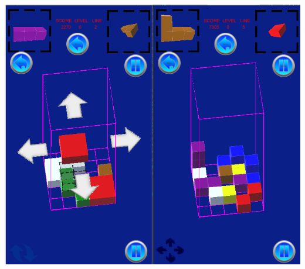 \documentclass[9pt, b5paper]{article}
\begin{document}
\includegraphics[width=.9\linewidth]{./pic/readme_20221104_272732.png}
\end{document}
